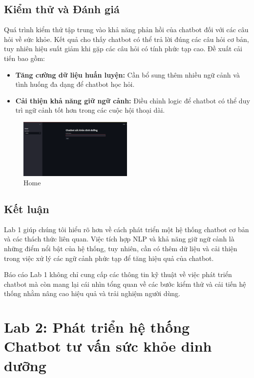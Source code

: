 \documentclass[a4paper,12pt]{report}
\begin{document}
\section{Kiểm thử và Đánh giá}
Quá trình kiểm thử tập trung vào khả năng phản hồi của chatbot đối với các câu hỏi về sức khỏe. Kết quả cho thấy chatbot có thể trả lời đúng các câu hỏi cơ bản, tuy nhiên hiệu suất giảm khi gặp các câu hỏi có tính phức tạp cao. Đề xuất cải tiến bao gồm:
\begin{itemize}
    \item \textbf{Tăng cường dữ liệu huấn luyện:} Cần bổ sung thêm nhiều ngữ cảnh và tình huống đa dạng để chatbot học hỏi.
    \item \textbf{Cải thiện khả năng giữ ngữ cảnh:} Điều chỉnh logic để chatbot có thể duy trì ngữ cảnh tốt hơn trong các cuộc hội thoại dài.
\end{itemize}

\begin{figure}[h]
    \centering
    \includegraphics[width=0.5\textwidth]{image/home.png}
    \caption{Home}
    \label{fig:home}
\end{figure}


\section{Kết luận}
Lab 1 giúp chúng tôi hiểu rõ hơn về cách phát triển một hệ thống chatbot cơ bản và các thách thức liên quan. Việc tích hợp NLP và khả năng giữ ngữ cảnh là những điểm nổi bật của hệ thống, tuy nhiên, cần có thêm dữ liệu và cải thiện trong việc xử lý các ngữ cảnh phức tạp để tăng hiệu quả của chatbot.

Báo cáo Lab 1 không chỉ cung cấp các thông tin kỹ thuật về việc phát triển chatbot mà còn mang lại cái nhìn tổng quan về các bước kiểm thử và cải tiến hệ thống nhằm nâng cao hiệu quả và trải nghiệm người dùng.

\chapter{Lab 2: Phát triển hệ thống Chatbot tư vấn sức khỏe dinh dưỡng}
\end{document}
